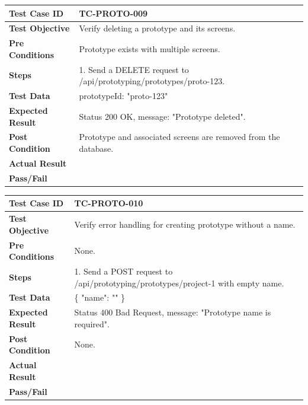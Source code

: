 \begin{longtable}{|p{}|p{}|}
\hline
\textbf{Test Case ID} & TC-PROTO-009 \\ \hline
\textbf{Test Objective} & Verify deleting a prototype and its screens. \\ \hline
\textbf{Pre Conditions} & Prototype exists with multiple screens. \\ \hline
\textbf{Steps} & 
1. Send a DELETE request to /api/prototyping/prototypes/proto-123. \\ \hline
\textbf{Test Data} & prototypeId: "proto-123" \\ \hline
\textbf{Expected Result} & Status 200 OK, message: "Prototype deleted". \\ \hline
\textbf{Post Condition} & Prototype and associated screens are removed from the database. \\ \hline
\textbf{Actual Result} &  \\ \hline
\textbf{Pass/Fail} &  \\ \hline
\end{longtable}

\begin{longtable}{|p{}|p{}|}
\hline
\textbf{Test Case ID} & TC-PROTO-010 \\ \hline
\textbf{Test Objective} & Verify error handling for creating prototype without a name. \\ \hline
\textbf{Pre Conditions} & None. \\ \hline
\textbf{Steps} & 
1. Send a POST request to /api/prototyping/prototypes/project-1 with empty name. \\ \hline
\textbf{Test Data} & \{ "name": "" \} \\ \hline
\textbf{Expected Result} & Status 400 Bad Request, message: "Prototype name is required". \\ \hline
\textbf{Post Condition} & None. \\ \hline
\textbf{Actual Result} &  \\ \hline
\textbf{Pass/Fail} &  \\ \hline
\end{longtable}